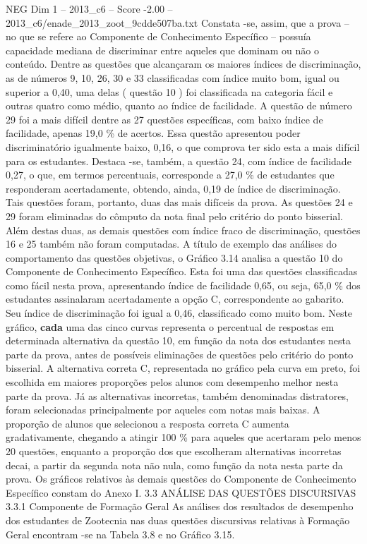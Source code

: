 \begin{textsample}{NEG Dim 1 – 2013\_c6 – Score -2.00 – 2013\_c6/enade\_2013\_zoot\_9cdde507ba.txt}
Constata -se, assim, que a prova – no que se refere ao Componente de Conhecimento Específico – possuía capacidade mediana de discriminar entre aqueles que dominam ou não o conteúdo.
Dentre as questões que alcançaram os maiores índices de discriminação, as de números 9, 10, 26, 30 e 33 classificadas com índice muito bom, igual ou superior a 0,40, uma delas ( questão 10 ) foi classificada na categoria fácil e outras quatro como médio, quanto ao índice de facilidade.
A questão de número 29 foi a mais difícil dentre as 27 questões específicas, com baixo índice de facilidade, apenas 19,0 \% de acertos.
Essa questão apresentou poder discriminatório igualmente baixo, 0,16, o que comprova ter sido esta a mais difícil para os estudantes.
Destaca -se, também, a questão 24, com índice de facilidade 0,27, o que, em termos percentuais, corresponde a 27,0 \% de estudantes que responderam acertadamente, obtendo, ainda, 0,19 de índice de discriminação.
Tais questões foram, portanto, duas das mais difíceis da prova.
As questões 24 e 29 foram eliminadas do cômputo da nota final pelo critério do ponto bisserial.
Além destas duas, as demais questões com índice fraco de discriminação, questões 16 e 25 também não foram computadas.
A título de exemplo das análises do comportamento das questões objetivas, o Gráfico 3.14 analisa a questão 10 do Componente de Conhecimento Específico.
Esta foi uma das questões classificadas como fácil nesta prova, apresentando índice de facilidade 0,65, ou seja, 65,0 \% dos estudantes assinalaram acertadamente a opção C, correspondente ao gabarito.
Seu índice de discriminação foi igual a 0,46, classificado como muito bom.
Neste gráfico, \textbf{cada} uma das cinco curvas representa o percentual de respostas em determinada alternativa da questão 10, em função da nota dos estudantes nesta parte da prova, antes de possíveis eliminações de questões pelo critério do ponto bisserial.
A alternativa correta C, representada no gráfico pela curva em preto, foi escolhida em maiores proporções pelos alunos com desempenho melhor nesta parte da prova.
Já as alternativas incorretas, também denominadas distratores, foram selecionadas principalmente por aqueles com notas mais baixas.
A proporção de alunos que selecionou a resposta correta C aumenta gradativamente, chegando a atingir 100 \% para aqueles que acertaram pelo menos 20 questões, enquanto a proporção dos que escolheram alternativas incorretas decai, a partir da segunda nota não nula, como função da nota nesta parte da prova.
Os gráficos relativos às demais questões do Componente de Conhecimento Específico constam do Anexo I. 3.3 ANÁLISE DAS QUESTÕES DISCURSIVAS 3.3.1 Componente de Formação Geral As análises dos resultados de desempenho dos estudantes de Zootecnia nas duas questões discursivas relativas à Formação Geral encontram -se na Tabela 3.8 e no Gráfico 3.15.

\end{textsample}
